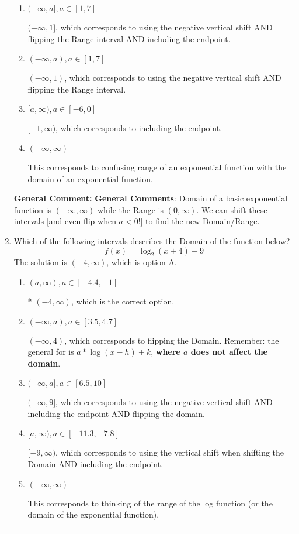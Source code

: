 \documentclass{extbook}[14pt]
\newcommand{\litem}[1]{\item #1

\rule{\textwidth}{0.4pt}}
\begin{document}
\begin{enumerate}
{\begin{enumerate}[label=\Alph*.]
* $(-1, \infty)$, which is the correct option.
\item \( (-\infty, a], a \in [1, 7] \)

$(-\infty, 1]$, which corresponds to using the negative vertical shift AND flipping the Range interval AND including the endpoint.
\item \( (-\infty, a), a \in [1, 7] \)

$(-\infty, 1)$, which corresponds to using the negative vertical shift AND flipping the Range interval.
\item \( [a, \infty), a \in [-6, 0] \)

$[-1, \infty)$, which corresponds to including the endpoint.
\item \( (-\infty, \infty) \)

This corresponds to confusing range of an exponential function with the domain of an exponential function.
\end{enumerate}

\textbf{General Comment:} \textbf{General Comments}: Domain of a basic exponential function is $(-\infty, \infty)$ while the Range is $(0, \infty)$. We can shift these intervals [and even flip when $a<0$!] to find the new Domain/Range.
}
\litem{
Which of the following intervals describes the Domain of the function below?
\[ f(x) = \log_2{(x+4)}-9 \]The solution is \( (-4, \infty) \), which is option A.\begin{enumerate}[label=\Alph*.]
\item \( (a, \infty), a \in [-4.4, -1] \)

* $(-4, \infty)$, which is the correct option.
\item \( (-\infty, a), a \in [3.5, 4.7] \)

$(-\infty, 4)$, which corresponds to flipping the Domain. Remember: the general for is $a*\log(x-h)+k$, \textbf{where $a$ does not affect the domain}.
\item \( (-\infty, a], a \in [6.5, 10] \)

$(-\infty, 9]$, which corresponds to using the negative vertical shift AND including the endpoint AND flipping the domain.
\item \( [a, \infty), a \in [-11.3, -7.8] \)

$[-9, \infty)$, which corresponds to using the vertical shift when shifting the Domain AND including the endpoint.
\item \( (-\infty, \infty) \)

This corresponds to thinking of the range of the log function (or the domain of the exponential function).
\end{enumerate}

}
\end{enumerate}
\end{document}
